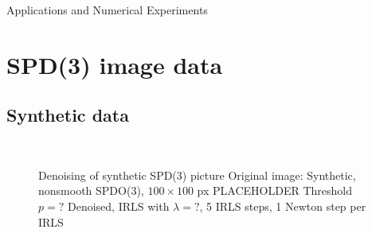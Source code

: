 \begin{chapter}{Applications and Numerical Experiments}


\FloatBarrier
\section{SPD(3) image data} %
\label{sec:SPD(3) image data}

\subsection{Synthetic data} %
\label{sub:Synthetic data}

\begin{figure}[h!]
    \centering
    \\
    \caption[Denoising of synthetic SPD(3) picture]{Denoising of synthetic SPD(3) picture
	 Original image: Synthetic, nonsmooth SPDO(3), $100\times 100$ px PLACEHOLDER
	 Threshold $p=?$
	 Denoised, IRLS with $\lambda=?$, 5 IRLS steps, 1 Newton step per IRLS
	\label{fig:application_spd1}
    }
\end{figure}


\end{chapter}
